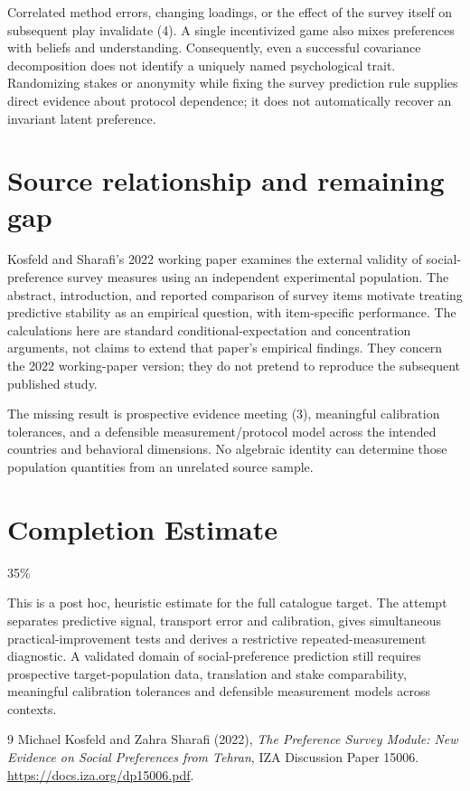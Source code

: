 \documentclass[11pt]{article}
\begin{document}
Correlated method errors, changing loadings, or the effect of the survey
itself on subsequent play invalidate (4). A single incentivized game also
mixes preferences with beliefs and understanding. Consequently, even a
successful covariance decomposition does not identify a uniquely named
psychological trait. Randomizing stakes or anonymity while fixing the
survey prediction rule supplies direct evidence about protocol dependence;
it does not automatically recover an invariant latent preference.

\section{Source relationship and remaining gap}
Kosfeld and Sharafi's 2022 working paper examines the external validity of
social-preference survey measures using an independent experimental
population. The abstract, introduction, and reported comparison of survey
items motivate treating predictive stability as an empirical question,
with item-specific performance. The calculations here are standard
conditional-expectation and concentration arguments, not claims to extend
that paper's empirical findings. They concern the 2022 working-paper
version; they do not pretend to reproduce the subsequent published study.

The missing result is prospective evidence meeting (3), meaningful
calibration tolerances, and a defensible measurement/protocol model across
the intended countries and behavioral dimensions. No algebraic identity
can determine those population quantities from an unrelated source sample.

\section{Completion Estimate}
35\%

This is a post hoc, heuristic estimate for the full catalogue target.
The attempt separates predictive signal, transport error and calibration, gives simultaneous practical-improvement tests and derives a restrictive repeated-measurement diagnostic. A validated domain of social-preference prediction still requires prospective target-population data, translation and stake comparability, meaningful calibration tolerances and defensible measurement models across contexts.

\begin{thebibliography}{9}
 Michael Kosfeld and Zahra Sharafi (2022),
\emph{The Preference Survey Module: New Evidence on Social Preferences from Tehran},
IZA Discussion Paper 15006. \url{https://docs.iza.org/dp15006.pdf}.
\end{thebibliography}
\end{document}
